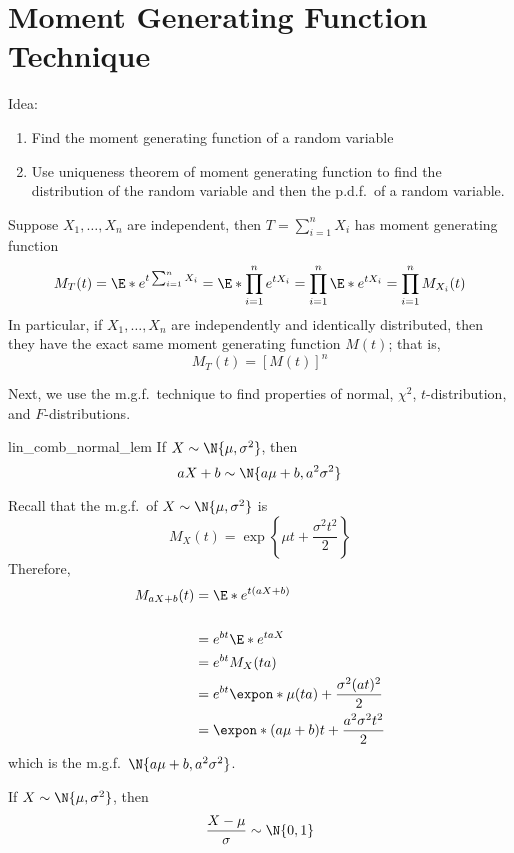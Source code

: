 \section{Moment Generating Function Technique}
Idea:
\begin{enumerate}[label=(\arabic*)]
    \item Find the moment generating function of a random variable
    \item Use uniqueness theorem of moment generating function
          to find the distribution of the random variable and then
          the p.d.f.\ of a random variable.
\end{enumerate}
\begin{Theorem}{}{}
    Suppose $ X_1,\ldots,X_n $
    are independent, then $ T=\sum_{i=1}^{n} X_i $
    has moment generating function
    \[ M_T(t)=\E*{e^{t \sum_{i=1}^{n} X_i}}=
        \E*{\prod_{i=1}^n e^{tX_i}}=\prod_{i=1}^n \E*{e^{tX_i}}=
        \prod_{i=1}^n M_{X_i}(t) \]
    In particular, if $ X_1,\ldots,X_n $ are independently
    and identically distributed, then they
    have the exact same moment generating function $ M(t) $;
    that is,
    \[ M_T(t)=\left[ M(t) \right]^n \]
\end{Theorem}
Next, we use the m.g.f.\ technique to find properties
of normal, $ \chi^2 $, $ t $-distribution,
and $ F $-distributions.

\begin{Lemma}{}{lin_comb_normal_lem}
    If $ X \sim \N{\mu,\sigma^2} $, then
    \[ aX+b \sim \N{a\mu+b,a^2\sigma^2} \]
\end{Lemma}
\begin{Proof}{}{}
    Recall that the m.g.f.\ of $ X \sim \N{\mu,\sigma^2} $ is
    \[ M_X(t)
        =\exp\left\{ \mu t+\frac{\sigma^2t^2}{2}\right\} \]
    Therefore,
    \begin{align*}
        M_{aX+b}(t)
         & =\E*{e^{t(aX+b)}}                                 \\                                                            \\
         & =e^{b t}\E*{e^{taX}}                              \\
         & =e^{b t}M_X(ta)                                   \\
         & =e^{b t}\expon*{\mu(ta)+\frac{\sigma^2(at)^2}{2}} \\
         & =\expon*{(a\mu+b)t+\frac{a^2\sigma^2t^2}{2}}
    \end{align*}
    which is the m.g.f.\ $ \N{a\mu+b,a^2\sigma^2} $.
\end{Proof}
\begin{Theorem}{}{}
    If $ X \sim \N{\mu,\sigma^2} $, then
    \[ \frac{X-\mu}{\sigma} \sim \N{0,1} \]
\end{Theorem}

